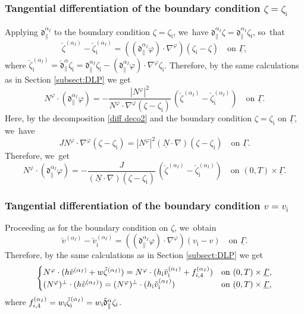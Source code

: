 \documentclass[11pt]{article}
\newcommand{\dpar}{{\mathfrak d}_{\parallel}}
\newcommand{\ul}[1]{\underline{#1}}
\newcommand{\itGamma}{\mathit{\Gamma}}
\newcommand{\cmfalpha}{\check{\mathfrak{d}}^{\alpha}}
\theoremstyle{definition}
\begin{document}
\subsubsection{Tangential differentiation of the boundary condition $\zeta=\zeta_\mathrm{i}$}
Applying $\dpar^{\alpha_I}$ to the boundary condition $\zeta=\zeta_\mathrm{i}$, we~have $\dpar^{\alpha_I}\zeta=\dpar^{\alpha_I}\zeta_\mathrm{i}$, so~that
\[
\check{\zeta}^{(\alpha_I)}-\check{\zeta}_\mathrm{i}^{(\alpha_I)} = ((\dpar^{\alpha_I}\varphi)\cdot\nabla^\varphi)(\zeta_\mathrm{i}-\zeta)
\quad\mbox{on } \ul{\itGamma},
\]
where $\check{\zeta}_\mathrm{i}^{(\alpha_I)} = \cmfalpha_\parallel \zeta_\mathrm{i}
= \dpar^{\alpha_I}\zeta_\mathrm{i}-(\dpar^{\alpha_I}\varphi)\cdot\nabla^\varphi\zeta_\mathrm{i}$.
Therefore, by the same calculations as in Section \ref{subsect:DLP} we get
\[
N^\varphi\cdot(\dpar^{\alpha_I}\varphi)
= -\frac{|N^\varphi|^2}{N^\varphi\cdot\nabla^\varphi(\zeta-\zeta_\mathrm{i})}\,(\check{\zeta}^{(\alpha_I)}-\check{\zeta}_\mathrm{i}^{(\alpha_I)})\quad\text{on }\ul{\itGamma}.
\]
Here, by the decomposition \eqref{diff deco2} and the boundary condition $\zeta=\zeta_\mathrm{i}$ on $\ul{\itGamma}$, we~have
\[
JN^\varphi\cdot\nabla^\varphi(\zeta-\zeta_\mathrm{i})=|N^\varphi|^2(\ul{N}\cdot\nabla)(\zeta-\zeta_\mathrm{i})\quad\text{on }\ul{\itGamma}.
\]
Therefore, we~get
\begin{equation}\label{EqPhi2}
N^\varphi\cdot(\dpar^{\alpha_I}\varphi)
= - \frac{J}{(\ul{N}\cdot\nabla)(\zeta-\zeta_\mathrm{i})}\,(\check{\zeta}^{(\alpha_I)}-\check{\zeta}_\mathrm{i}^{(\alpha_I)})
\quad\text{on } (0,T)\times\ul{\itGamma}.
\end{equation}

\subsubsection{Tangential differentiation of the boundary condition $v=v_\mathrm{i}$}
Proceeding as for the boundary condition on $\zeta$, we~obtain
\[
\check{v}^{(\alpha_I)}-\check{v}_\mathrm{i}^{(\alpha_I)} = ((\dpar^{\alpha_I}\varphi)\cdot\nabla^\varphi)(v_\mathrm{i}-v)
\quad\mbox{on } \ul{\itGamma}.
\]
Therefore, by the same calculations as in Section \ref{subsect:DLP} we get
\begin{equation}\label{QLBC0}
\begin{cases}
N^\varphi\cdot(h\check{v}^{(\alpha_I)}+w\check{\zeta}^{(\alpha_I)})
= N^\varphi\cdot(h_\mathrm{i}\check{v}_\mathrm{i}^{(\alpha_I)}+f_{{\rm i},4}^{(\alpha_I)}) &\text{on } (0,T)\times\ul{\itGamma}, \\
(N^\varphi)^\perp\cdot(h\check{v}^{(\alpha_I)})=(N^\varphi)^\perp\cdot(h_\mathrm{i}\check{v}_\mathrm{i}^{(\alpha_I)}) &\text{on } (0,T)\times\ul{\itGamma},
\end{cases}
\end{equation}
where $f_{{\rm i},4}^{(\alpha_I)}= w_\mathrm{i} \check{\zeta}_\mathrm{i}^{(\alpha_I)} = w_\mathrm{i} \cmfalpha_\parallel \zeta_\mathrm{i}$.
\end{document}
